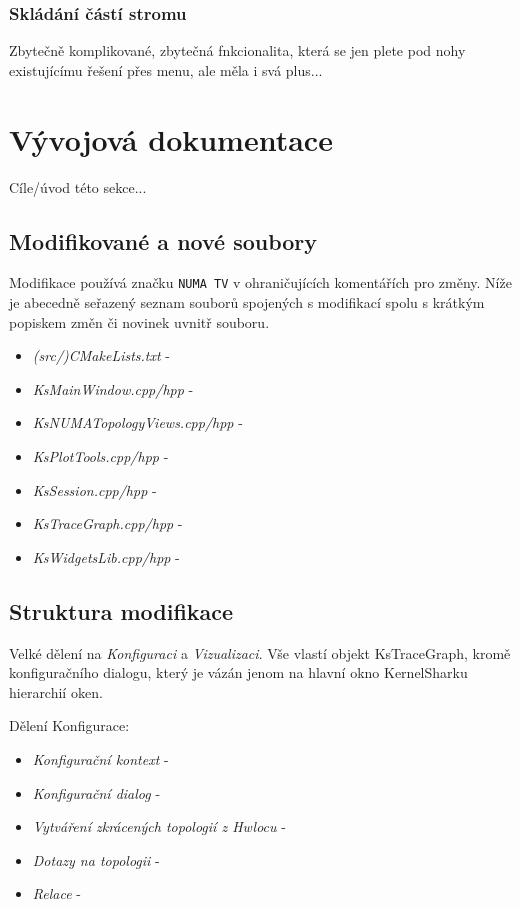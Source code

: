 \subsubsection*{Skládání částí stromu}
Zbytečně komplikované, zbytečná fnkcionalita, která se jen plete pod nohy existujícímu řešení přes menu, ale měla i svá plus...

\section{Vývojová dokumentace}
Cíle/úvod této sekce...

\subsection{Modifikované a nové soubory}
Modifikace používá značku \texttt{NUMA TV} v ohraničujících komentářích pro změny. Níže je abecedně seřazený seznam souborů spojených s modifikací spolu s krátkým popiskem změn či novinek uvnitř souboru.
\begin{itemize}
    \item \emph{(src/)CMakeLists.txt} -
    \item \emph{KsMainWindow.cpp/hpp} - 
    \item \emph{KsNUMATopologyViews.cpp/hpp} -
    \item \emph{KsPlotTools.cpp/hpp} - 
    \item \emph{KsSession.cpp/hpp} -
    \item \emph{KsTraceGraph.cpp/hpp} - 
    \item \emph{KsWidgetsLib.cpp/hpp} -
\end{itemize}

\subsection{Struktura modifikace}
Velké dělení na \emph{Konfiguraci} a \emph{Vizualizaci}. Vše vlastí objekt KsTraceGraph, kromě konfiguračního dialogu, který je vázán jenom na hlavní okno KernelSharku hierarchií oken.

Dělení Konfigurace:
\begin{itemize}
    \item \emph{Konfigurační kontext} -
    \item \emph{Konfigurační dialog} -
    \item \emph{Vytváření zkrácených topologií z Hwlocu} -
    \item \emph{Dotazy na topologii} -
    \item \emph{Relace} -
\end{itemize}

